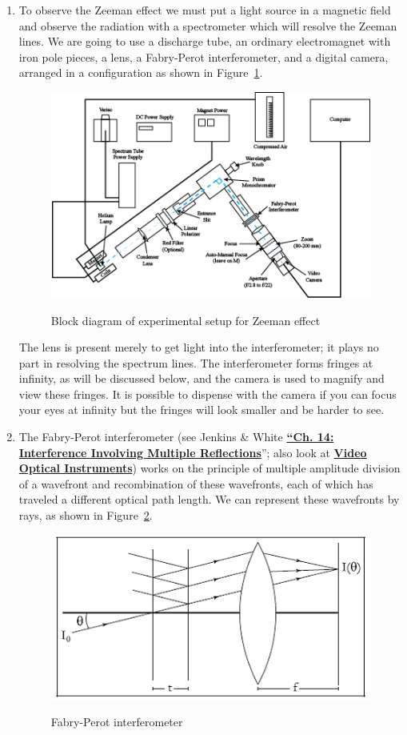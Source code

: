 \documentclass{../lab}
\begin{document}
\begin{enumerate}
    \item To observe the Zeeman effect we must put a light source in a magnetic field and observe the radiation with a spectrometer which will resolve the Zeeman lines. We are going to use a discharge tube, an ordinary electromagnet with iron pole pieces, a lens, a Fabry-Perot interferometer, and a digital camera, arranged in a configuration as shown in Figure~\ref{fig:ATM-zeeman}. 
    \begin{figure}[h]
        \centering
        \href{http://experimentationlab.berkeley.edu/sites/default/files/ATM/ATM-zeeman_0_0.png}{\includegraphics[width=0.5\linewidth]{images/ATM-zeeman.png}}
        \caption{Block diagram of experimental setup for Zeeman effect}
        \label{fig:ATM-zeeman}
    \end{figure}

	The lens is present merely to get light into the interferometer; it plays no part in resolving the spectrum lines. The interferometer forms fringes at infinity, as will be discussed below, and the camera is used to magnify and view these fringes. It is possible to dispense with the camera if you can focus your eyes at infinity but the fringes will look smaller and be harder to see.

    \item The Fabry-Perot interferometer (see Jenkins \& White \href{http://physics111.lib.berkeley.edu/Physics111/Reprints/ATM/04-Interference.pdf}{\textbf{``Ch. 14: Interference Involving Multiple Reflections}}''; also look at \href{http://youtu.be/zUGBt5vc5FA}{\textbf{Video Optical Instruments}}) works on the principle of multiple amplitude division of a wavefront and recombination of these wavefronts, each of which has traveled a different optical path length. We can represent these wavefronts by rays, as shown in Figure~\ref{fig:Atm1image005}.

    \begin{figure}[H]
        \centering
        \href{http://experimentationlab.berkeley.edu/sites/default/files/images/Atm1image005.gif}{\includegraphics[width=0.5\linewidth]{images/Atm1image005.png}}
        \caption{Fabry-Perot interferometer}
        \label{fig:Atm1image005}
    \end{figure}


\end{enumerate}
\end{document}
